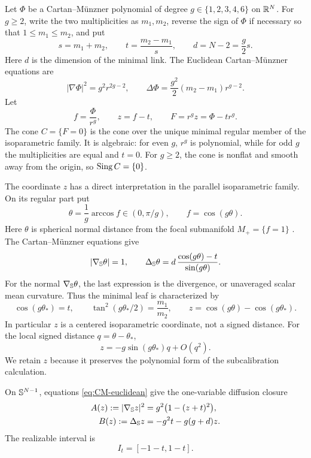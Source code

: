 Let \(\Phi\) be a Cartan--M\"unzner polynomial of degree
\(g\in\{1,2,3,4,6\}\) on \(\mathbb R^N\).
For \(g\geq2\), write the two
multiplicities as \(m_1,m_2\), reverse the sign of \(\Phi\) if
necessary so that \(1\leq m_1\leq m_2\), and put
\begin{equation}\label{eq:iso-parameters}
 s=m_1+m_2,\qquad t=\frac{m_2-m_1}{s},\qquad
 d=N-2=\frac g2s.
\end{equation}
Here \(d\) is the dimension of the minimal link.  The Euclidean
Cartan--M\"unzner equations are
\begin{equation}\label{eq:CM-euclidean}
 |\nabla\Phi|^2=g^2r^{2g-2},
 \qquad
 \Delta\Phi=\frac{g^2}{2}(m_2-m_1)r^{g-2}.
\end{equation}
Let
\begin{equation}\label{eq:iso-F-z}
 f=\frac{\Phi}{r^g},\qquad z=f-t,
 \qquad F=r^gz=\Phi-tr^g.
\end{equation}
The cone \(C=\{F=0\}\) is the cone over the unique minimal regular
member of the isoparametric family.  It is algebraic: for even \(g\),
\(r^g\) is polynomial, while for odd \(g\) the multiplicities are equal
and \(t=0\).
For \(g\geq2\), the cone is nonflat and smooth away from the origin,
so \(\operatorname{Sing} C=\{0\}\).

The coordinate \(z\) has a direct interpretation in the parallel
isoparametric family.  On its regular part put
\[
 \theta=\frac1g\arccos f\in(0,\pi/g),\qquad f=\cos(g\theta).
\]
Here \(\theta\) is spherical normal distance from the focal submanifold
\(M_+=\{f=1\}\) \cite[Section~4, pp.~14--16]{Chi20}.
The Cartan--M\"unzner equations give
\[
 |\nabla_{\mathbb S}\theta|=1,\qquad
 \Delta_{\mathbb S}\theta
 =d\,\frac{\cos(g\theta)-t}{\sin(g\theta)}.
\]
For the normal \(\nabla_{\mathbb S}\theta\), the last expression is the
divergence, or unaveraged scalar mean curvature.  Thus the minimal leaf
is characterized by
\[
 \cos(g\theta_*)=t,\qquad
 \tan^2(g\theta_*/2)=\frac{m_1}{m_2},\qquad
 z=\cos(g\theta)-\cos(g\theta_*).
\]
In particular \(z\) is a centered isoparametric coordinate, not a
signed distance.  For the local signed distance \(q=\theta-\theta_*\),
\[
 z=-g\sin(g\theta_*)q+O(q^2).
\]
We retain \(z\) because it preserves the polynomial form of the
subcalibration calculation.

On \(\mathbb S^{N-1}\), equations \eqref{eq:CM-euclidean} give the one-variable
diffusion closure
\begin{align}
 A(z):=|\nabla_{\mathbb S}z|^2
 &=g^2\bigl(1-(z+t)^2\bigr),                 \label{eq:A-z}\\
 B(z):=\Delta_{\mathbb S}z
 &=-g^2t-g(g+d)z.                            \label{eq:B-z}
\end{align}
The realizable interval is
\begin{equation}\label{eq:z-interval}
 I_t=[-1-t,1-t].
\end{equation}

